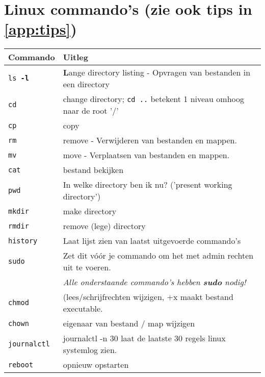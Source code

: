 \section{Linux commando's (zie ook tips in \ref{app:tips})}\label{app:commands}

	\begin{tabular}{|l|l|}
		\hline
		Commando & Uitleg \\ \hline
		\texttt{ls \textbf{-l}} & \textbf{L}ange directory listing - Opvragen van bestanden in een directory  \\ \hline
		\texttt{cd} & change directory; \texttt{cd ..} betekent 1 niveau omhoog naar de root '/' \\ \hline
	    \texttt{cp} & copy \\ \hline
	    \texttt{rm} & remove - Verwijderen van bestanden en mappen. \\ \hline
	    \texttt{mv} & move - Verplaatsen van bestanden en mappen. \\ \hline
	    \texttt{cat} & bestand bekijken \\ \hline
	    \texttt{pwd} & In welke directory ben ik nu? ('present working directory') \\ \hline
	    \texttt{mkdir} & make directory \\ \hline
		\texttt{rmdir} & remove (lege) directory \\ \hline
	    \texttt{history} & Laat lijst zien van laatst uitgevoerde commando's \\ \hline
	    \texttt{sudo} & Zet dit vóór je commando om het met admin rechten uit te voeren.\\
	    ~ & \emph{Alle onderstaande commando's hebben \textbf{sudo} nodig!} \\ \hline
	    \texttt{chmod} & (lees/schrijfrechten wijzigen, +x maakt bestand executable. \\ \hline
	    \texttt{chown} & eigenaar van bestand / map wijzigen \\ \hline
	    \texttt{journalctl} & journalctl -n 30 laat de laatste 30 regels linux systemlog zien. \\ \hline
	    \texttt{reboot} & opnieuw opstarten \\ \hline
	\end{tabular}
